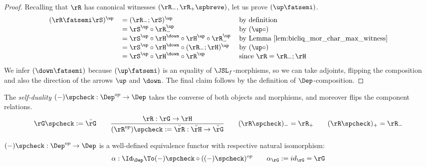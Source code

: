 \documentclass{article}
\begin{document}
\begin{proof}
Recalling that $\rR$ has canonical witnesses $(\rR_-, \rR_+\spbreve)$, let us prove $(\up\fatsemi)$.
\[
\begin{tabular}{lll}
$(\rR \fatsemi \rS)^\up$
&
$= (\rR_- ; \rS)^\up$
& by definition
\\&
$= \rS^\up \circ \rR_-^\up$
& by $(\up\circ)$
\\&
$= \rS^\up \circ \rH^\down \circ \rH^\up \circ \rR_-^\up$
& by Lemma \ref{lem:bicliq_mor_char_max_witness}
\\&
$= \rS^\up \circ \rH^\down \circ (\rR_- ; \rH)^\up$
& by $(\up\circ)$
\\&
$= \rS^\up \circ \rH^\down \circ \rR^\up$
& since $\rR = \rR_- ; \rH$
\end{tabular}
\]
We infer $(\down\fatsemi)$ because $(\up\fatsemi)$ is an equality of $\JSL_f$-morphisms, so we can take adjoints, flipping the composition and also the direction of the arrows $\up$ and $\down$. The final claim follows by the definition of $\Dep$-composition.
\end{proof}


\begin{definition}
\label{def:bicliq_self_duality}
The \emph{self-duality} $(-)\spcheck : \Dep^{op} \to \Dep$ takes the converse of both objects and morphisms, and moreover flips the component relations.
\[
\rG\spcheck := \breve{\rG}
\qquad
\dfrac{\rR : \rG \to \rH}{(\rR^{op})\spcheck := \breve{\rR} : \breve{\rH} \to \breve{\rG}}
\qquad
(\rR\spcheck)_- = \rR_+
\qquad
(\rR\spcheck)_+ = \rR_-
\]
\endbox
\end{definition}

\begin{theorem}
\label{thm:bicliq_self_dual}
$(-)\spcheck : \Dep^{op} \to \Dep$ is a well-defined equivalence functor with respective natural isomorphism:
\[
\alpha : \Id_{\Dep} \To (-)\spcheck \circ ((-)\spcheck)^{op}
\qquad
\alpha_\rG := id_\rG = \rG
\]
\end{theorem}
\end{document}
